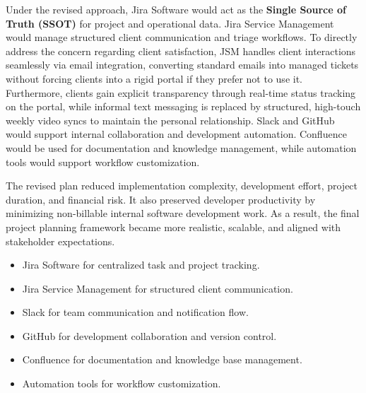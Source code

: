 \documentclass[12pt,a4paper]{report}
\begin{document}
Under the revised approach, Jira Software would act as the \textbf{Single Source of Truth (SSOT)} for project and operational data. Jira Service Management would manage structured client communication and triage workflows. To directly address the concern regarding client satisfaction, JSM handles client interactions seamlessly via email integration, converting standard emails into managed tickets without forcing clients into a rigid portal if they prefer not to use it. Furthermore, clients gain explicit transparency through real-time status tracking on the portal, while informal text messaging is replaced by structured, high-touch weekly video syncs to maintain the personal relationship. Slack and GitHub would support internal collaboration and development automation. Confluence would be used for documentation and knowledge management, while automation tools would support workflow customization.

The revised plan reduced implementation complexity, development effort, project duration, and financial risk. It also preserved developer productivity by minimizing non-billable internal software development work. As a result, the final project planning framework became more realistic, scalable, and aligned with stakeholder expectations.

\begin{itemize}[leftmargin=*]
    \item Jira Software for centralized task and project tracking.
    \item Jira Service Management for structured client communication.
    \item Slack for team communication and notification flow.
    \item GitHub for development collaboration and version control.
    \item Confluence for documentation and knowledge base management.
    \item Automation tools for workflow customization.
\end{itemize}
\end{document}
